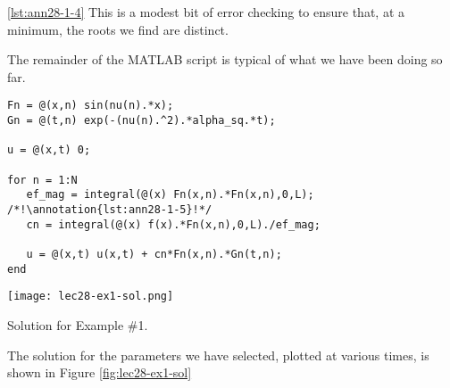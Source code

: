 \vspace{0.25cm}

\noindent \ref{lst:ann28-1-4} This is a modest bit of error checking to ensure that, at a minimum, the roots we find are distinct.

\vspace{0.25cm}

\noindent The remainder of the MATLAB script is typical of what we have been doing so far.

\begin{lstlisting}[name=lec28-ex1, style=myMatlab]
%% Construct solution
Fn = @(x,n) sin(nu(n).*x);
Gn = @(t,n) exp(-(nu(n).^2).*alpha_sq.*t); 

u = @(x,t) 0;

for n = 1:N
   ef_mag = integral(@(x) Fn(x,n).*Fn(x,n),0,L); /*!\annotation{lst:ann28-1-5}!*/
   cn = integral(@(x) f(x).*Fn(x,n),0,L)./ef_mag;
   
   u = @(x,t) u(x,t) + cn*Fn(x,n).*Gn(t,n);
end

\end{lstlisting}
\begin{marginfigure}
\texttt{[image: lec28-ex1-sol.png]}
\caption{Solution for Example \#1.}
\label{fig:lec28-ex1-sol}
\end{marginfigure}
The solution for the parameters we have selected, plotted at various times, is shown in Figure \ref{fig:lec28-ex1-sol}


